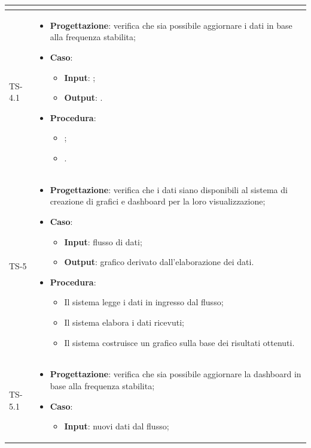 \begin{longtable}{|C{2.5cm}|C{13cm}|}
\begin{itemize}
\end{itemize}
	\\
	\hline
	{TS-4.1} & 
\begin{itemize}
	\item \textbf{Progettazione}: verifica che sia possibile aggiornare i dati
	in base alla frequenza stabilita;
	\item \textbf{Caso}: 
	\begin{itemize}
		\item \textbf{Input}: ;
		\item \textbf{Output}: .
	\end{itemize}
	\item \textbf{Procedura}:
	\begin{itemize}
		\item ;
		\item .
	\end{itemize} 
\end{itemize}
	\\
	\hline
	{TS-5} & 
\begin{itemize}
	\item \textbf{Progettazione}: verifica che i dati siano disponibili al sistema di
	creazione di grafici e dashboard per la loro visualizzazione;
	\item \textbf{Caso}: 
	\begin{itemize}
		\item \textbf{Input}: flusso di dati;
		\item \textbf{Output}: grafico derivato dall'elaborazione dei dati.
	\end{itemize}
	\item \textbf{Procedura}:
	\begin{itemize}
		\item Il sistema legge i dati in ingresso dal flusso;
		\item Il sistema elabora i dati ricevuti;
		\item Il sistema costruisce un grafico sulla base dei risultati ottenuti.
	\end{itemize} 
\end{itemize}
	\\
	\hline
	{TS-5.1} & 
\begin{itemize}
	\item \textbf{Progettazione}: verifica che sia possibile aggiornare la
	dashboard in base alla frequenza stabilita;
	\item \textbf{Caso}: 
	\begin{itemize}
		\item \textbf{Input}: nuovi dati dal flusso;

\end{itemize}
\end{itemize}
\end{longtable}
